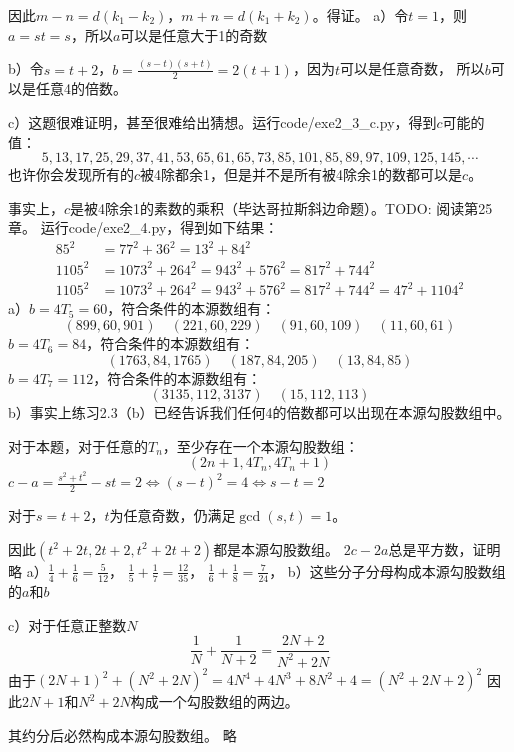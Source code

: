 因此$m-n=d(k_1-k_2)$，$m+n=d(k_1+k_2)$。得证。
%
\exercise 
a）令$t=1$，则$a=st=s$，所以$a$可以是任意大于1的奇数\par
b）令$s=t+2$，$b=\frac{(s-t)(s+t)}{2}=2(t+1)$，因为$t$可以是任意奇数，
所以$b$可以是任意4的倍数。\par
c）这题很难证明，甚至很难给出猜想。运行code/exe2\_3\_c.py，得到$c$可能的值：
\[5, 13, 17, 25, 29, 37, 41, 53, 65, 61, 65, 73, 85, 101, 85, 89, 97, 109, 125, 145,  \cdots\]
也许你会发现所有的$c$被4除都余1，但是并不是所有被4除余1的数都可以是$c$。\par
事实上，$c$是被4除余1的素数的乘积（毕达哥拉斯斜边命题）。TODO: 阅读第25章。
%
\exercise 运行code/exe2\_4.py，得到如下结果：
\begin{align*}
85^2 &= 77^2 + 36^2 = 13^2 + 84^2 \\
1105^2 &= 1073^2 + 264^2 = 943^2 + 576^2 = 817^2 + 744^2 \\
1105^2 &= 1073^2 + 264^2 = 943^2 + 576^2 = 817^2 + 744^2 = 47^2 + 1104^2
\end{align*}    
%
\exercise a）$b=4T_5=60$，符合条件的本源数组有：
\[(899, 60, 901)\quad (221, 60, 229)\quad (91, 60, 109)\quad (11, 60, 61)\]
$b=4T_6=84$，符合条件的本源数组有：
\[(1763, 84, 1765)\quad (187, 84, 205)\quad (13, 84, 85)\]
$b=4T_7=112$，符合条件的本源数组有：
\[(3135, 112, 3137)\quad (15, 112, 113)\]
b）事实上练习2.3（b）已经告诉我们任何4的倍数都可以出现在本源勾股数组中。\par
对于本题，对于任意的$T_n$，至少存在一个本源勾股数组：
\[(2n+1, 4T_n, 4T_n+1)\]
%
\exercise
$c - a = \frac{s^2+t^2}{2} - st = 2 \Leftrightarrow (s-t)^2 = 4 \Leftrightarrow s- t = 2$\par
对于$s = t+2$，$t$为任意奇数，仍满足$\gcd(s, t) = 1$。\par
因此$(t^2+2t, 2t+2, t^2+2t+2)$都是本源勾股数组。
%
\exercise $2c-2a$总是平方数，证明略
%
\exercise a）$\frac{1}{4} + \frac{1}{6} = \frac{5}{12}$，
$\frac{1}{5} + \frac{1}{7} = \frac{12}{35}$，
$\frac{1}{6} + \frac{1}{8} = \frac{7}{24}$，
b）这些分子分母构成本源勾股数组的$a$和$b$\par
c）\proof 对于任意正整数$N$
\[\frac{1}{N} + \frac{1}{N+2} = \frac{2N+2}{N^2+2N}\]
由于$(2N+1)^2 + (N^2+2N)^2 = 4N^4+4N^3+8N^2+4=(N^2+2N+2)^2$
因此$2N+1$和$N^2+2N$构成一个勾股数组的两边。\par
其约分后必然构成本源勾股数组。
%
\exercise 略
